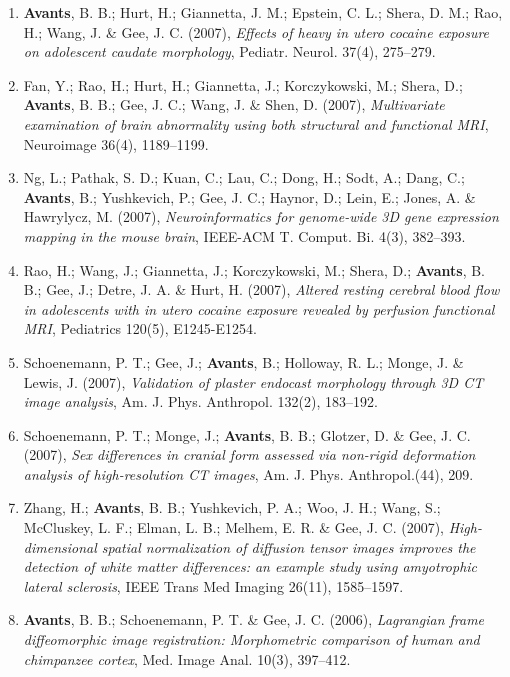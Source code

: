 \documentclass[11pt]{moderncv} %
\begin{document}
\begin{enumerate}
\item  \textbf{Avants}, B. B.; Hurt, H.; Giannetta, J. M.; Epstein, C. L.; Shera, D. M.; Rao, H.; Wang, J. \&  Gee, J. C. (2007), \textit{Effects of heavy in utero cocaine exposure on adolescent caudate morphology}, Pediatr. Neurol. 37(4), 275--279.

\item  Fan, Y.; Rao, H.; Hurt, H.; Giannetta, J.; Korczykowski, M.; Shera, D.; \textbf{Avants}, B. B.; Gee, J. C.; Wang, J. \&  Shen, D. (2007), \textit{Multivariate examination of brain abnormality using both structural and functional MRI}, Neuroimage 36(4), 1189--1199.

\item  Ng, L.; Pathak, S. D.; Kuan, C.; Lau, C.; Dong, H.; Sodt, A.; Dang, C.; \textbf{Avants}, B.; Yushkevich, P.; Gee, J. C.; Haynor, D.; Lein, E.; Jones, A. \&  Hawrylycz, M. (2007), \textit{Neuroinformatics for genome-wide 3D gene expression mapping in the mouse brain}, IEEE-ACM T. Comput. Bi. 4(3), 382--393.

\item  Rao, H.; Wang, J.; Giannetta, J.; Korczykowski, M.; Shera, D.; \textbf{Avants}, B. B.; Gee, J.; Detre, J. A. \&  Hurt, H. (2007), \textit{Altered resting cerebral blood flow in adolescents with in utero cocaine exposure revealed by perfusion functional MRI}, Pediatrics 120(5), E1245-E1254.

\item  Schoenemann, P. T.; Gee, J.; \textbf{Avants}, B.; Holloway, R. L.; Monge, J. \&  Lewis, J. (2007), \textit{Validation of plaster endocast morphology through 3D CT image analysis}, Am. J. Phys. Anthropol. 132(2), 183--192.

\item  Schoenemann, P. T.; Monge, J.; \textbf{Avants}, B. B.; Glotzer, D. \&  Gee, J. C. (2007), \textit{Sex differences in cranial form assessed via non-rigid deformation analysis of high-resolution CT images}, Am. J. Phys. Anthropol.(44), 209.

\item  Zhang, H.; \textbf{Avants}, B. B.; Yushkevich, P. A.; Woo, J. H.; Wang, S.; McCluskey, L. F.; Elman, L. B.; Melhem, E. R. \&  Gee, J. C. (2007), \textit{High-dimensional spatial normalization of diffusion tensor images improves the detection of white matter differences: an example study using amyotrophic lateral sclerosis}, IEEE Trans Med Imaging 26(11), 1585--1597.

\item  \textbf{Avants}, B. B.; Schoenemann, P. T. \&  Gee, J. C. (2006), \textit{Lagrangian frame diffeomorphic image registration: Morphometric comparison of human and chimpanzee cortex}, Med. Image Anal. 10(3), 397--412.


\end{enumerate}
\end{document}
